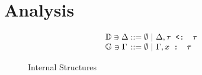 \documentclass[acmsmall]{acmart}
\begin{document}



\section{Analysis}



\begin{figure*}[h]
\[
\begin{array}{l @{} l}
  \mathbb{D} \owns \Delta 
  &{} ::=
  \begin{array}[t]{@{} l}
    \emptyset 
    \ |\ 
    \Delta, \code{$\tau$ <: $\tau$}
  \end{array}
  \\
  \mathbb{G} \owns \Gamma 
  &{} ::=
  \begin{array}[t]{@{} l}
    \emptyset 
    \ |\ 
    \Gamma, \code{$x$ : $\tau$}
  \end{array}
\end{array}
\]

\caption{Internal Structures}
\end{figure*}


\end{document}

